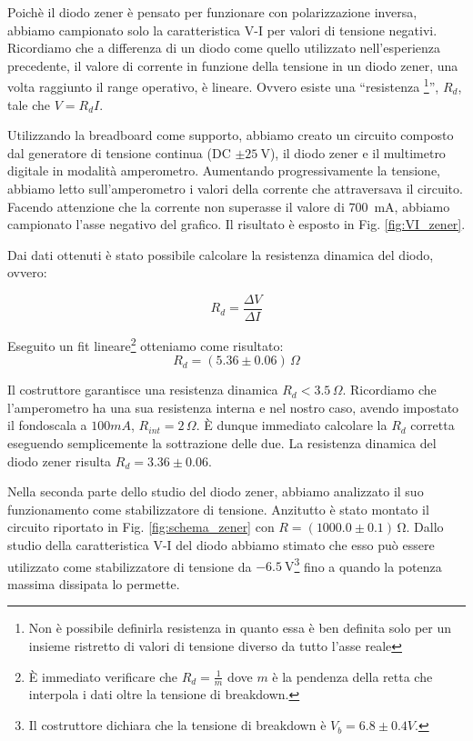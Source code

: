 Poichè il diodo zener è pensato per funzionare con polarizzazione inversa, abbiamo campionato solo la caratteristica V-I per valori di tensione negativi. Ricordiamo che a differenza di un diodo come quello utilizzato nell'esperienza precedente, il valore di corrente in funzione della tensione in un diodo zener, una volta raggiunto il range operativo, è lineare. Ovvero esiste una ``resistenza \footnote{Non è possibile definirla resistenza in quanto essa è ben definita solo per un insieme ristretto di valori di tensione diverso da tutto l'asse reale}'', $R_d$, tale che $V=R_d I$.

Utilizzando la breadboard come supporto, abbiamo creato un circuito composto dal generatore di tensione continua (DC $\pm \SI{25}{\volt}$), il diodo zener e il multimetro digitale in modalità amperometro. Aumentando progressivamente la tensione, abbiamo letto sull'amperometro i valori della corrente che attraversava il circuito.
Facendo attenzione che la corrente non superasse il valore di \SI{700}{\milli\ampere}, abbiamo campionato l'asse negativo del grafico. Il risultato è esposto in Fig. \ref{fig:VI_zener}.

Dai dati ottenuti è stato possibile calcolare la resistenza dinamica del diodo, ovvero:

\begin{equation}
R_d=\frac{\Delta V}{\Delta I}
\label{scemopagliaccio}
\end{equation}

Eseguito un fit lineare\footnote{È immediato verificare che $R_d=\frac{1}{m}$ dove $m$ è la pendenza della retta che interpola i dati oltre la tensione di breakdown.} otteniamo come risultato:
$$R_d= (5.36 \pm 0.06)\,\Omega$$

Il costruttore garantisce una resistenza dinamica $R_d<3.5 \, \Omega$. Ricordiamo che l'amperometro ha una sua resistenza interna e nel nostro caso, avendo impostato il fondoscala a $100mA$, $R_{int}=2\, \Omega$. È dunque immediato calcolare la $R_d$ corretta eseguendo semplicemente la sottrazione delle due. La resistenza dinamica del diodo zener risulta $R_d=3.36 \pm 0.06$.

Nella seconda parte dello studio del diodo zener, abbiamo analizzato il suo funzionamento come stabilizzatore di tensione. Anzitutto è stato montato il circuito riportato in Fig. \ref{fig:schema_zener} con $R = (1000.0 \pm 0.1) \, \si{\ohm}$.  Dallo studio della caratteristica V-I del diodo abbiamo stimato che esso può essere utilizzato come stabilizzatore di tensione da $\SI{-6.5}{\volt}$\footnote{Il costruttore dichiara che la tensione di breakdown è $V_b=6.8 \pm 0.4 V$.} fino a quando la potenza massima dissipata lo permette. 

